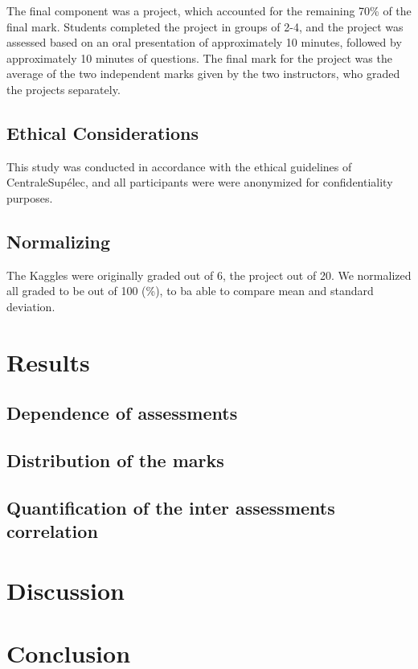 \documentclass[a4paper]{article}
\begin{document}
The final component was a project, which accounted for the remaining 70\% of the final mark.
Students completed the project in groups of 2-4, and the project was assessed based on an oral presentation of approximately 10 minutes, followed by approximately 10 minutes of questions.
The final mark for the project was the average of the two independent marks given by the two instructors, who graded the projects separately.

\subsection{Ethical Considerations}
This study was conducted in accordance with the ethical guidelines of CentraleSupélec, and all participants were were anonymized for confidentiality purposes.

\subsection{Normalizing}
The Kaggles were originally graded out of 6, the project out of 20.
We normalized all graded to be out of 100 (\%), to ba able to compare mean and standard deviation.

\section{Results}
\subsection{Dependence of assessments}
\subsection{Distribution of the marks}
\subsection{Quantification of the inter assessments correlation}
\section{Discussion}
\section{Conclusion}
\end{document}
